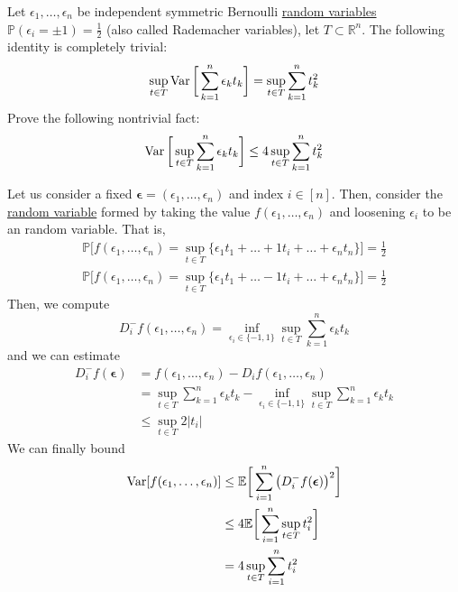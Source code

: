   \begin{exercise}
  Let $\epsilon_1, \ldots, \epsilon_n$ be independent symmetric Bernoulli \hyperref[prob-def:random-variable]{random variables} $\mathbb{P}(\epsilon_i = \pm 1) = \frac{1}{2}$ (also called Rademacher variables), let $T \subset \mathbb{R}^n$. The following identity is completely trivial: 
  \begin{equation}
    \sup_{t \in T} \operatorname{Var} \bigg[ \sum_{k=1}^n \epsilon_k t_k \bigg] = \sup_{t \in T} \sum_{k=1}^n t_k^2
  \end{equation}
  Prove the following nontrivial fact: 
  \begin{equation}
    \operatorname{Var} \bigg[ \sup_{t \in T} \sum_{k=1}^n \epsilon_k t_k \bigg] \leq 4 \sup_{t \in T} \sum_{k=1}^n t_k^2
  \end{equation}
  \end{exercise}
  \begin{solution}
  Let us consider a fixed $\boldsymbol{\epsilon} = (\epsilon_1, \ldots, \epsilon_n)$ and index $i \in [n]$. Then, consider the \hyperref[prob-def:random-variable]{random variable} formed by taking the value $f(\epsilon_1, \ldots, \epsilon_n)$ and loosening $\epsilon_i$ to be an random variable. That is, 
  \begin{align*}
      \mathbb{P} \Big[ f(\epsilon_1, \ldots, \epsilon_n) = \sup_{t \in T} \{\epsilon_1 t_1 + \ldots + 1 t_i + \ldots + \epsilon_n t_n\} \Big] = \frac{1}{2} \\
      \mathbb{P} \Big[ f(\epsilon_1, \ldots, \epsilon_n) = \sup_{t \in T} \{\epsilon_1 t_1 + \ldots - 1 t_i + \ldots + \epsilon_n t_n\} \Big] = \frac{1}{2} 
  \end{align*}
  Then, we compute 
  \begin{equation}
    D_i^- f (\epsilon_1, \ldots, \epsilon_n) = \inf_{\epsilon_i \in \{-1, 1\}} \sup_{t \in T} \sum_{k=1}^n \epsilon_k t_k
  \end{equation}
  and we can estimate 
  \begin{align*}
      D_i^- f(\boldsymbol{\epsilon}) & = f(\epsilon_1, \ldots, \epsilon_n) - D_i f (\epsilon_1, \ldots, \epsilon_n) \\
      & = \sup_{t \in T} \sum_{k=1}^n \epsilon_k t_k - \inf_{\epsilon_i \in \{-1, 1\}} \sup_{t \in T} \sum_{k=1}^n \epsilon_k t_k \\
      & \leq \sup_{t \in T} 2 |t_i| 
  \end{align*}
  We can finally bound 
  \begin{align*}
      \operatorname{Var}[ f(\epsilon_1, \ldots, \epsilon_n)] & \leq \mathbb{E} \bigg[ \sum_{i=1}^n \big( D_i^- f(\boldsymbol{\epsilon})\big)^2 \bigg] \\
      & \leq 4 \mathbb{E} \bigg[ \sum_{i=1}^n \sup_{t \in T} t_i^2 \bigg] \\
      & = 4 \sup_{t \in T} \sum_{i=1}^n t_i^2 
  \end{align*}
  \end{solution}

